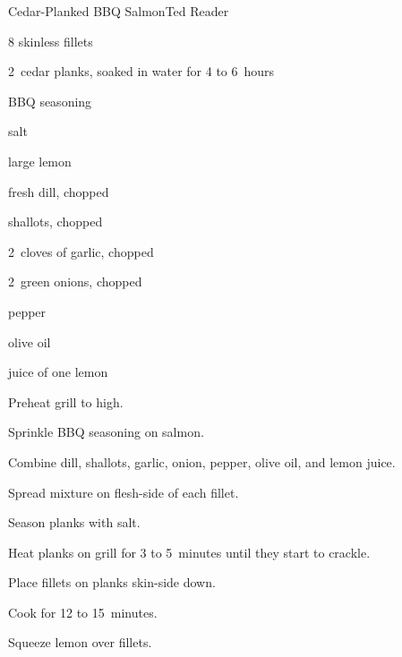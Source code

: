 \begin{recipe}{Cedar-Planked BBQ Salmon}{Ted Reader}{}

\begin{ingredients}
\item 8   skinless fillets
\item 2~cedar planks, soaked in water for 4 to 6~hours
\item {} BBQ seasoning
\item salt
\item large lemon
\item {} fresh dill, chopped
\item \C{\half} shallots, chopped
\item 2~cloves of garlic, chopped
\item 2~green onions, chopped
\item {} pepper
\item {} olive oil
\item juice of one lemon
\end{ingredients}

\begin{directions}
\item Preheat grill to high.
\item Sprinkle BBQ seasoning on salmon.
\item Combine dill, shallots, garlic, onion, pepper, olive oil, and lemon juice.
\item Spread mixture on flesh-side of each fillet.
\item Season planks with salt.
\item Heat planks on grill for 3 to 5~minutes until they start to crackle.
\item Place fillets on planks skin-side down.
\item Cook for 12 to 15~minutes.
\item Squeeze lemon over fillets.
\end{directions}

\end{recipe}
